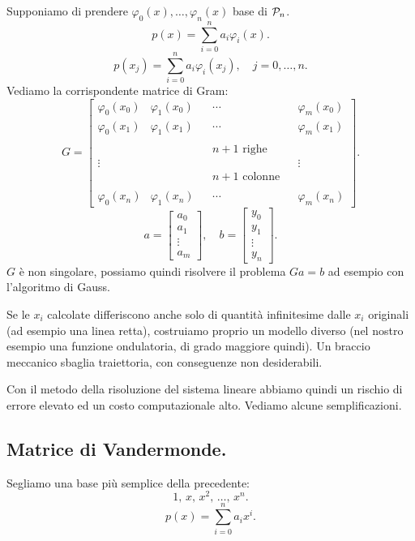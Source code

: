 Supponiamo di prendere $\varphi_0(x), \ldots, \varphi_n(x)$ base di $\mathcal{P}_n$.
\[p(x) = \sum_{i = 0}^{n}a_i\varphi_i(x).\]
\[p(x_j) = \sum_{i = 0}^{n}a_i\varphi_i(x_j), \quad j = 0, \ldots, n.\]
Vediamo la corrispondente matrice di Gram:
\[
G = \left[
\begin{array}{cccccc}
\varphi_0(x_0) & \varphi_1(x_0) & & \cdots & & \varphi_m(x_0) \\
\varphi_0(x_1) & \varphi_1(x_1) & & \cdots & & \varphi_m(x_1) \\
\\
& & & n+1 \textrm{ righe} & &\\
\vdots & & & & & \vdots \\
& & & n+1 \textrm{ colonne} & &\\
\\
\varphi_0(x_n) & \varphi_1(x_n) & & \cdots & & \varphi_m(x_n)
\end{array}\right].
\]
\[ a =
\left[\begin{array}{c}
a_0 \\
a_1 \\
\vdots \\
a_m
\end{array}\right], \quad b =
\left[\begin{array}{c}
y_0 \\
y_1 \\
\vdots \\
y_n
\end{array}\right].
\]
$G$ è non singolare, possiamo quindi risolvere il problema $Ga = b$ ad esempio
con l'algoritmo di Gauss.

\begin{osse}
Se le $x_i$ calcolate differiscono anche solo di quantità infinitesime dalle
$x_i$ originali (ad esempio una linea retta), costruiamo proprio un modello
diverso (nel nostro esempio una funzione ondulatoria, di grado maggiore
quindi).
Un braccio meccanico sbaglia traiettoria, con conseguenze non desiderabili.
\end{osse}

Con il metodo della risoluzione del sistema lineare abbiamo quindi un rischio
di errore elevato ed un costo computazionale alto. Vediamo alcune
semplificazioni.

\subsection{Matrice di Vandermonde.}
Segliamo una base più semplice della precedente:
\[1,\, x, \, x^2, \, \ldots, \, x^n.\]
\[p(x) = \sum_{i = 0}^{n}a_ix^i.\]


